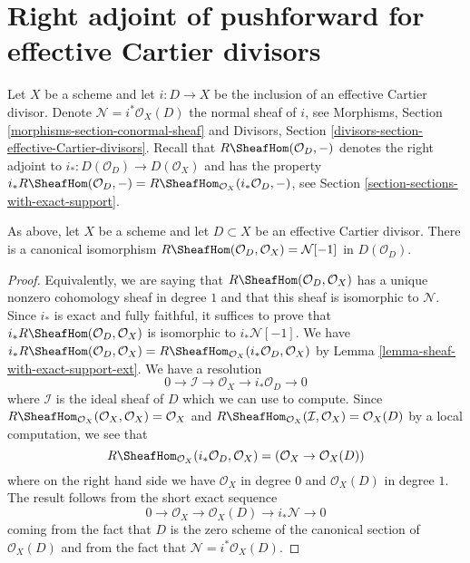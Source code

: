\section{Right adjoint of pushforward for effective Cartier divisors}
\label{section-dualizing-Cartier}

\noindent
Let $X$ be a scheme and let $i : D \to X$ be the inclusion of an
effective Cartier divisor. Denote $\mathcal{N} = i^*\mathcal{O}_X(D)$
the normal sheaf of $i$, see
Morphisms, Section \ref{morphisms-section-conormal-sheaf}
and
Divisors, Section \ref{divisors-section-effective-Cartier-divisors}.
Recall that $R\SheafHom(\mathcal{O}_D, -)$
denotes the right adjoint to $i_* : D(\mathcal{O}_D) \to D(\mathcal{O}_X)$
and has the property
$i_*R\SheafHom(\mathcal{O}_D, -) =
R\SheafHom_{\mathcal{O}_X}(i_*\mathcal{O}_D, -)$,
see Section \ref{section-sections-with-exact-support}.

\begin{lemma}
\label{lemma-compute-for-effective-Cartier}
As above, let $X$ be a scheme and let $D \subset X$ be an
effective Cartier divisor. There is a canonical isomorphism
$R\SheafHom(\mathcal{O}_D, \mathcal{O}_X) = \mathcal{N}[-1]$
in $D(\mathcal{O}_D)$.
\end{lemma}

\begin{proof}
Equivalently, we are saying that $R\SheafHom(\mathcal{O}_D, \mathcal{O}_X)$
has a unique nonzero cohomology sheaf in degree $1$ and that this
sheaf is isomorphic to $\mathcal{N}$. Since $i_*$ is exact and fully
faithful, it suffices to prove that
$i_*R\SheafHom(\mathcal{O}_D, \mathcal{O}_X)$ is isomorphic
to $i_*\mathcal{N}[-1]$. We have
$i_*R\SheafHom(\mathcal{O}_D, \mathcal{O}_X) =
R\SheafHom_{\mathcal{O}_X}(i_*\mathcal{O}_D, \mathcal{O}_X)$
by Lemma \ref{lemma-sheaf-with-exact-support-ext}. We have a resolution
$$
0 \to \mathcal{I} \to \mathcal{O}_X \to i_*\mathcal{O}_D \to 0
$$
where $\mathcal{I}$ is the ideal sheaf of $D$
which we can use to compute. Since
$R\SheafHom_{\mathcal{O}_X}(\mathcal{O}_X, \mathcal{O}_X) = \mathcal{O}_X$ and
$R\SheafHom_{\mathcal{O}_X}(\mathcal{I}, \mathcal{O}_X) = \mathcal{O}_X(D)$ by
a local computation, we see that
$$
R\SheafHom_{\mathcal{O}_X}(i_*\mathcal{O}_D, \mathcal{O}_X) =
(\mathcal{O}_X \to \mathcal{O}_X(D))
$$
where on the right hand side we have $\mathcal{O}_X$ in degree $0$
and $\mathcal{O}_X(D)$ in degree $1$. The result follows from the
short exact sequence
$$
0 \to \mathcal{O}_X \to \mathcal{O}_X(D) \to i_*\mathcal{N} \to 0
$$
coming from the fact that $D$ is the zero scheme of the canonical section
of $\mathcal{O}_X(D)$ and from the fact that
$\mathcal{N} = i^*\mathcal{O}_X(D)$.
\end{proof}

